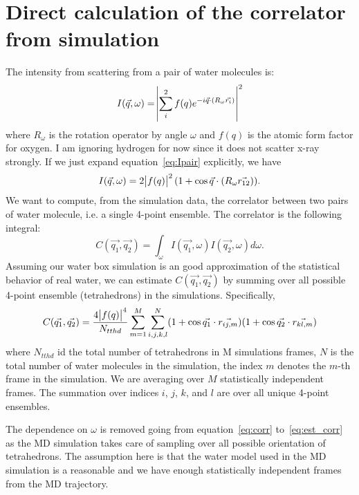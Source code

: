 \documentclass[20pt]{article}
\begin{document}
\section{Direct calculation of the correlator from simulation}
The intensity from scattering from a pair of water molecules is:
\begin{equation} \label{eq:Ipair}
I(\vec{q},\omega) = \abs{\sum_{i}^{2} f(q) e^{-i \vec{q} \cdot (R_{\omega} \vec{r_i})}}^2
\end{equation}
where $R_{\omega}$ is the rotation operator by angle $\omega$ and $f(q)$ is the atomic form factor for oxygen. I am ignoring hydrogen for now since it does not scatter x-ray strongly. If we just expand equation~\ref{eq:Ipair} explicitly, we have
\begin{equation} \label{eq:Ipair_exp}
I(\vec{q},\omega) = 2\abs{f(q)}^2 (1+\cos{\vec{q} \cdot (R_{\omega} \vec{r_{12}})} ).
\end{equation}
We want to compute, from the simulation data, the correlator between two pairs of water molecule, i.e. a single 4-point ensemble. The correlator is the following integral:
\begin{equation} \label{eq:corr}
C(\vec{q_1}, \vec{q_2}) = \int_{\omega} I(\vec{q_1},\omega) I(\vec{q_2},\omega) d\omega.
\end{equation}
Assuming our water box simulation is an good approximation of the statistical behavior of real water, we can estimate $C(\vec{q_1}, \vec{q_2})$ by summing over all possible 4-point ensemble (tetrahedrons) in the simulations. Specifically,
\begin{equation} \label{eq:est_corr}
C(\vec{q_1}, \vec{q_2})  = \frac{ 4 \abs{f(q)}^4 }{N_{tthd}} \sum_{m=1}^{M} \sum^{N}_{i,j,k,l}  (1+\cos{\vec{q_1} \cdot \vec{r_{ij,m}}} ) (1+\cos{\vec{q_2} \cdot \vec{r_{kl,m}}} )
\end{equation}
where $N_{tthd}$ id the total number of tetrahedrons in M simulations frames, $N$ is the total number of water molecules in the simulation, the index $m$ denotes the $m$-th frame in the simulation. We are averaging over $M$ statistically independent frames. The summation over indices $i$, $j$, $k$, and $l$ are over all unique 4-point ensembles.

The dependence on $\omega$ is removed going from equation~\ref{eq:corr} to~\ref{eq:est_corr} as the MD simulation takes care of sampling over all possible orientation of tetrahedrons. The assumption here is that the water model used in the MD simulation is a reasonable and we have enough statistically independent frames from the MD trajectory. 
\end{document}
